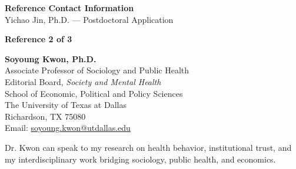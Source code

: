 \documentclass[11pt, letterpaper]{article}
\begin{document}
\thispagestyle{empty}

\begin{center}
    {\Large \textbf{Reference Contact Information}}\\
    \vspace{0.5em}
    Yichao Jin, Ph.D. --- Postdoctoral Application
\end{center}

\vspace{1.5em}

\begin{flushleft}
\textbf{Reference 2 of 3}
\end{flushleft}

\vspace{0.5em}

\begin{flushleft}
\textbf{Soyoung Kwon, Ph.D.}\\
\vspace{0.3em}
Associate Professor of Sociology and Public Health\\
Editorial Board, \textit{Society and Mental Health}\\
School of Economic, Political and Policy Sciences\\
The University of Texas at Dallas\\
Richardson, TX 75080\\
\vspace{0.5em}
Email: \href{mailto:soyoung.kwon@utdallas.edu}{soyoung.kwon@utdallas.edu}
\end{flushleft}

\vspace{1em}

\noindent Dr. Kwon can speak to my research on health behavior, institutional trust, and my interdisciplinary work bridging sociology, public health, and economics.
\end{document}
